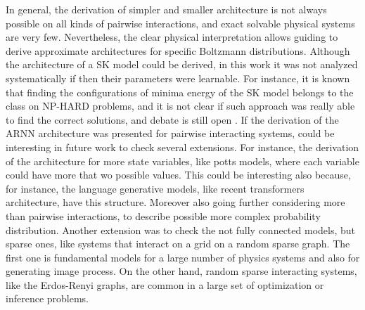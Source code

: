 \documentclass[aps,physrev,10pt,floatfix,reprint]{revtex4-2}
\begin{document}
In general, the derivation of simpler and smaller architecture is not always possible on all kinds of pairwise interactions, and exact solvable physical systems are very few. Nevertheless, the clear physical interpretation allows guiding to derive approximate architectures for specific Boltzmann distributions. Although the architecture of a SK model could be derived, in this work it was not analyzed systematically if then their parameters were learnable. For instance, it is known that finding the configurations of minima energy of the SK model belongs to the class on NP-HARD problems, and it is not clear if such approach was really able to find the correct solutions, and debate is still open \cite{}. 
If the derivation of the ARNN architecture was presented for pairwise interacting systems, could be interesting in future work to check several extensions. For instance, the derivation of the architecture for more state variables, like potts models, where each variable could have more that wo possible values. This could be interesting also because, for instance, the language generative models, like recent transformers architecture, have this structure. Moreover also going further considering more than pairwise interactions, to describe possible more complex probability distribution. Another extension was to check the not fully connected models, but sparse ones, like systems that interact on a grid on a random sparse graph. The first one is fundamental models for a large number of physics systems and also for generating image process. On the other hand, random sparse interacting systems, like the Erdos-Renyi graphs, are common in a large set of optimization or inference problems.  
%

\end{document}
